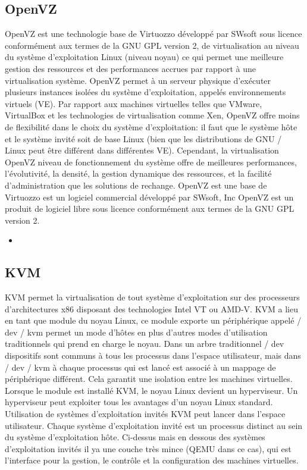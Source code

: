 \documentclass[a4paper,11pt]{report}
\begin{document}
\subsection{OpenVZ}
OpenVZ est une technologie base de Virtuozzo développé par SWsoft sous licence conformément aux termes de la GNU GPL version 2, de virtualisation au niveau du système d'exploitation Linux (niveau noyau) ce qui permet une meilleure gestion des ressources et des performances accrues par rapport à une virtualisation système. OpenVZ permet à un serveur physique d'exécuter plusieurs instances isolées du système d'exploitation, appelés environnements virtuels (VE).
Par rapport aux machines virtuelles telles que VMware, VirtualBox et les technologies de virtualisation comme Xen, OpenVZ offre moins de flexibilité dans le choix du système d'exploitation: il faut que le système hôte et le système invité soit de base Linux (bien que les distributions de GNU / Linux peut être différent dans différentes VE). Cependant, la virtualisation OpenVZ niveau de fonctionnement du système offre de meilleures performances, l'évolutivité, la densité, la gestion dynamique des ressources, et la facilité d'administration que les solutions de rechange.
OpenVZ est une base de Virtuozzo est un logiciel commercial développé par SWsoft, Inc OpenVZ est un produit de logiciel libre sous licence conformément aux termes de la GNU GPL version 2. 
\begin{itemize}
  \item 
\end{itemize}

\subsection{KVM}
KVM permet la virtualisation de tout système d'exploitation sur des processeurs d'architectures x86 disposant des technologies Intel VT ou AMD-V.
KVM a lieu en tant que module du noyau Linux, ce module exporte un périphérique appelé / dev / kvm permet un mode d'hôtes en plus d'autres modes d'utilisation traditionnels qui prend en charge le noyau. Dans un arbre traditionnel / dev dispositifs sont communs à tous les processus dans l'espace utilisateur, mais dans / dev / kvm à chaque processus qui est lancé est associé à un mappage de périphérique différent.
Cela garantit une isolation entre les machines virtuelles. Lorsque le module est installé KVM, le noyau Linux devient un hyperviseur. Un hyperviseur peut exploiter tous les avantages d'un noyau Linux standard.
Utilisation de systèmes d'exploitation invités KVM peut lancer dans l'espace utilisateur. Chaque système d'exploitation invité est un processus distinct au sein du système d'exploitation hôte. Ci-dessus mais en dessous des systèmes d'exploitation invités il ya une couche très mince (QEMU dans ce cas), qui est l'interface pour la gestion, le contrôle et la configuration des machines virtuelles.
\end{document}
